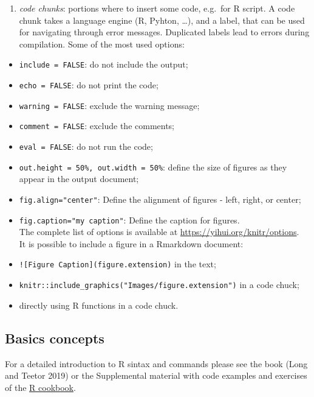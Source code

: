 \documentclass[
]{article}
\providecommand{\tightlist}{%
  \setlength{\itemsep}{0pt}\setlength{\parskip}{0pt}}
\begin{document}
\begin{enumerate}
\def\labelenumi{\arabic{enumi}.}
\setcounter{enumi}{2}
\tightlist
\item
  \emph{code chunks}: portions where to insert some code, e.g.~for R
  script. A code chunk takes a language engine (R, Pyhton, \ldots), and
  a label, that can be used for navigating through error messages.
  Duplicated labels lead to errors during compilation. Some of the most
  used options:
\end{enumerate}

\begin{itemize}
\item
  \texttt{include\ =\ FALSE}: do not include the output;
\item
  \texttt{echo\ =\ FALSE}: do not print the code;
\item
  \texttt{warning\ =\ FALSE}: exclude the warning message;
\item
  \texttt{comment\ =\ FALSE}: exclude the comments;
\item
  \texttt{eval\ =\ FALSE}: do not run the code;
\item
  \texttt{out.height\ =\ 50\%,\ out.width\ =\ 50\%}: define the size of
  figures as they appear in the output document;
\item
  \texttt{fig.align="center"}: Define the alignment of figures - left,
  right, or center;
\item
  \texttt{fig.caption="my\ caption"}: Define the caption for figures.\\
  The complete list of options is available at
  \url{https://yihui.org/knitr/options}.\\
  It is possible to include a figure in a Rmarkdown document:
\item
  \texttt{!{[}Figure\ Caption{]}(figure.extension)} in the text;
\item
  \texttt{knitr::include\_graphics("Images/figure.extension")} in a code
  chuck;
\item
  directly using R functions in a code chuck.
\end{itemize}

\hypertarget{basics-concepts}{%
\subsection{Basics concepts}\label{basics-concepts}}

For a detailed introduction to R sintax and commands please see the book
(Long and Teetor 2019) or the Supplemental material with code examples
and exercises of the \href{https://rc2e.com/}{R cookbook}.
\end{document}

